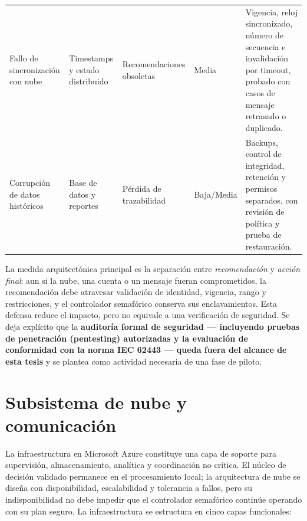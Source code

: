 \begin{landscape}
\begin{longtable}{@{}p{4.2cm}p{3.6cm}p{3.6cm}p{1.8cm}p{10.2cm}@{}}
Fallo de sincronización con nube & Timestamps y estado distribuido & Recomendaciones obsoletas & Media & Vigencia, reloj sincronizado, número de secuencia e invalidación por timeout, probado con casos de mensaje retrasado o duplicado.\\
Corrupción de datos históricos & Base de datos y reportes & Pérdida de trazabilidad & Baja/Media & Backups, control de integridad, retención y permisos separados, con revisión de política y prueba de restauración.\\
\end{longtable}
\end{landscape}

La medida arquitectónica principal es la separación entre \emph{recomendación} y \emph{acción
final}: aun si la nube, una cuenta o un mensaje fueran comprometidos, la recomendación debe
atravesar validación de identidad, vigencia, rango y restricciones, y el controlador semafórico
conserva sus enclavamientos. Esta defensa reduce el impacto, pero no equivale a una
verificación de seguridad. Se deja explícito que la \textbf{auditoría formal de seguridad ---
incluyendo pruebas de penetración (pentesting) autorizadas y la evaluación de conformidad con la
norma IEC 62443 --- queda fuera del alcance de esta tesis} y se plantea como actividad necesaria
de una fase de piloto.

\section{Subsistema de nube y comunicación}\label{sec:nube}

La infraestructura en Microsoft Azure constituye una capa de soporte para supervisión,
almacenamiento, analítica y coordinación no crítica. El núcleo de decisión validado permanece en
el procesamiento local; la arquitectura de nube se diseña con disponibilidad, escalabilidad y
tolerancia a fallos, pero su indisponibilidad no debe impedir que el controlador semafórico
continúe operando con su plan seguro. La infraestructura se estructura en cinco capas
funcionales:

